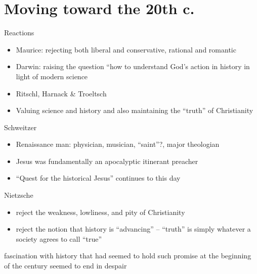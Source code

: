 \section{Moving toward the 20th c.}
\label{sec-4}
\begin{frame}[label=sec-4-1]{Reactions}
\begin{itemize}
\item Maurice: rejecting both liberal and conservative, rational and romantic
\item Darwin: raising the question ``how to understand God's action in history in light of modern science
\item Ritschl, Harnack \& Troeltsch
\item Valuing science and history and \alert{also} maintaining the ``truth'' of Christianity
\end{itemize}
\end{frame}
\begin{frame}[label=sec-4-2]{Schweitzer}
\begin{itemize}
\item Renaissance man: physician, musician, ``saint''?, major theologian
\item Jesus was fundamentally an apocalyptic itinerant preacher
\item ``Quest for the historical Jesus'' continues to this day
\end{itemize}
\end{frame}
\begin{frame}[label=sec-4-3]{Nietzsche}
\begin{itemize}
\item reject the weakness, lowliness, and pity of Christianity
\item reject the notion that history is ``advancing'' -- ``truth'' is simply whatever a society agrees to call ``true''
\end{itemize}
\begin{block}{fascination with history}
that had seemed to hold such promise at the beginning of the century seemed to end in despair
\end{block}
\end{frame}

